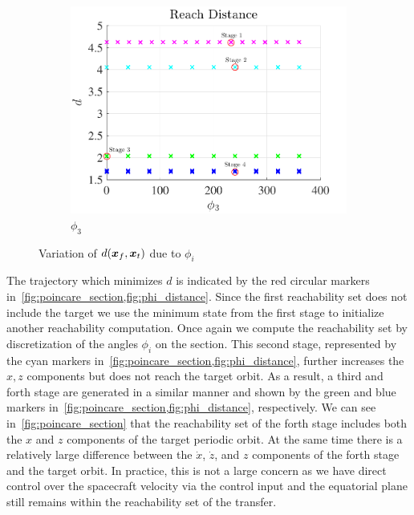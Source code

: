 \begin{figure}[htbp]
\begin{subfigure}[htbp]{0.3\textwidth}
        \includegraphics[width=\textwidth]{figures/2016_AAS/phi3.pdf} 
        \caption{\( \phi_3 \)} \label{fig:phi3} 
    \end{subfigure} 
    \caption{Variation of \(d(\bm{x}_f,\bm{x}_t)\) due to \( \phi_i\)}
    \label{fig:phi_distance} 
\end{figure}

The trajectory which minimizes \( d \) is indicated by the red circular markers in~\cref{fig:poincare_section,fig:phi_distance}.
Since the first reachability set does not include the target we use the minimum state from the first stage to initialize another reachability computation.
Once again we compute the reachability set by discretization of the angles \( \phi_i \) on the \Poincare section.
This second stage, represented by the cyan markers in~\cref{fig:poincare_section,fig:phi_distance}, further increases the \( x, z\) components but does not reach the target orbit.
As a result, a third and forth stage are generated in a similar manner and shown by the green and blue markers in~\cref{fig:poincare_section,fig:phi_distance}, respectively.
We can see in~\cref{fig:poincare_section} that the reachability set of the forth stage includes both the \( x \) and \( z\) components of the target periodic orbit.
At the same time there is a relatively large difference between the \( \dot{x} \), \( \dot{z} \), and \( z \) components of the forth stage and the target orbit.
In practice, this is not a large concern as we have direct control over the spacecraft velocity via the control input and the equatorial plane still remains within the reachability set of the transfer.

